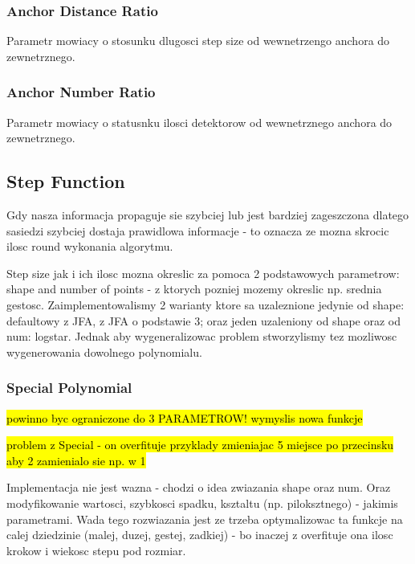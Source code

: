 \documentclass[format=acmsmall,screen,review,authordraft,nonacm]{acmart}
\begin{document}
\subsubsection{Anchor Distance Ratio}

Parametr mowiacy o stosunku dlugosci step size od wewnetrzengo anchora do
zewnetrznego.

\subsubsection{Anchor Number Ratio}

Parametr mowiacy o statusnku ilosci detektorow od wewnetrznego anchora do
zewnetrznego.

\subsection{Step Function} %

Gdy nasza informacja propaguje sie szybciej lub jest bardziej zageszczona
dlatego sasiedzi szybciej dostaja prawidlowa informacje - to oznacza ze mozna
skrocic ilosc round wykonania algorytmu.

Step size jak i ich ilosc mozna okreslic za pomoca 2 podstawowych parametrow:
shape and number of points - z ktorych pozniej mozemy okreslic np. srednia
gestosc. Zaimplementowalismy 2 warianty ktore sa uzaleznione jedynie od shape:
defaultowy z JFA, z JFA o podstawie 3; oraz jeden uzaleniony od shape oraz od num: logstar.
Jednak aby wygeneralizowac problem stworzylismy tez mozliwosc wygenerowania
dowolnego polynomialu.

\subsubsection{Special Polynomial}

\hl{powinno byc ograniczone do 3 PARAMETROW! wymyslis nowa funkcje}

\hl{problem z Special - on overfituje przyklady zmieniajac 5 miejsce po
przecinsku aby 2 zamienialo sie np. w 1}

Implementacja nie jest wazna - chodzi o idea zwiazania shape oraz num. Oraz
modyfikowanie wartosci, szybkosci spadku, ksztaltu (np. piloksztnego) - jakimis
parametrami. Wada tego rozwiazania jest ze trzeba optymalizowac ta funkcje na
calej dziedzinie (malej, duzej, gestej, zadkiej) - bo inaczej z overfituje ona
ilosc krokow i wiekosc stepu pod rozmiar.
\end{document}
